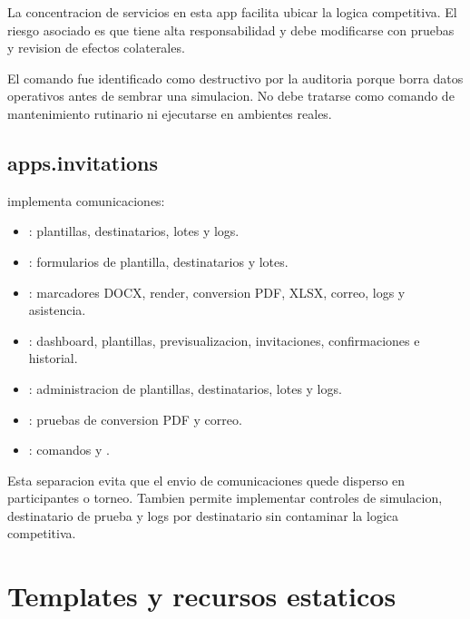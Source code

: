 La concentracion de servicios en esta app facilita ubicar la logica competitiva. El riesgo asociado es que  tiene alta responsabilidad y debe modificarse con pruebas y revision de efectos colaterales.

\begin{advertencia}
El comando  fue identificado como destructivo por la auditoria porque borra datos operativos antes de sembrar una simulacion. No debe tratarse como comando de mantenimiento rutinario ni ejecutarse en ambientes reales.
\end{advertencia}

\subsection{apps.invitations}

 implementa comunicaciones:

\begin{itemize}
  \item {}: plantillas, destinatarios, lotes y logs.
  \item {}: formularios de plantilla, destinatarios y lotes.
  \item {}: marcadores DOCX, render, conversion PDF, XLSX, correo, logs y asistencia.
  \item {}: dashboard, plantillas, previsualizacion, invitaciones, confirmaciones e historial.
  \item {}: administracion de plantillas, destinatarios, lotes y logs.
  \item {}: pruebas de conversion PDF y correo.
  \item {}: comandos  y .
\end{itemize}

Esta separacion evita que el envio de comunicaciones quede disperso en participantes o torneo. Tambien permite implementar controles de simulacion, destinatario de prueba y logs por destinatario sin contaminar la logica competitiva.

\section{Templates y recursos estaticos}
\label{sec:estructura-templates-static}

